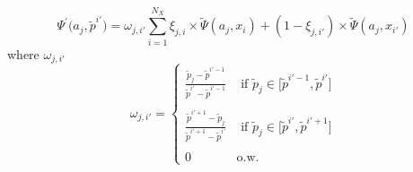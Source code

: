 \documentclass[a4paper,10pt]{article}  %
\begin{document}
\begin{equation}
   \Psi^{\prime} \Big( a_{j}, \tilde{p}^{i'} \Big) =  
         \omega_{j, i'} \sum_{ i=1 }^{N_X} \xi_{j,i} \times \widetilde{\Psi}(a_j, x_i) + 
         (1-\xi_{ j,{i'} }) \times \widetilde{\Psi}(a_j, x_{i'} )
\end{equation}
where $\omega_{j, i'}$
\begin{equation*}
   \label{eq:weight}
   \omega_{j,i'} = \begin{cases}
   \frac{ \tilde{p}_j - \tilde{p}^{i'-1} }{ \tilde{p}^{i'} - \tilde{p}^{i'-1} } & \text{ if } \tilde{p}_j \in \Big[
   \tilde{p}^{i'-1},\tilde{p}^{i'} \Big] \\ \ & \ \\
   \frac{ \tilde{p}^{i'+1} - \tilde{p}_j }{ \tilde{p}^{i'+1} - \tilde{p}^{i'} } & \text{ if } \tilde{p}_j \in \Big[
   \tilde{p}^{i'},\tilde{p}^{i'+1} \Big] \\ \ & \ \\ 0 & \text{o.w.}
   \end{cases}
\end{equation*}
\end{document}
